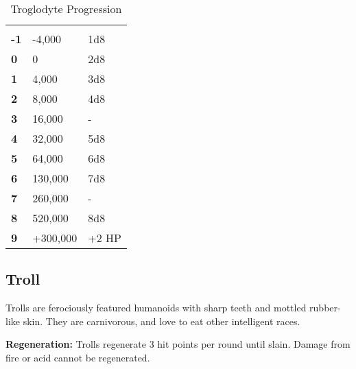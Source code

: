 \begin{multicols*}{2}
\begin {table}[H]
  \caption{Troglodyte Progression}
  \begin{tabularx}{\columnwidth}{>{\bfseries}YYY}
   &  & \\
	-1 & -4,000 & 1d8\\
	0 & 0 & 2d8\\
	1 & 4,000 & 3d8\\
	2 & 8,000 & 4d8\\
	3 & 16,000 & -\\
	4 & 32,000 & 5d8\\
	5 & 64,000 & 6d8\\
	6 & 130,000 & 7d8\\
	7 & 260,000 & -\\
	8 & 520,000 & 8d8\\
	9 & +300,000 & +2 HP
  \end {tabularx}
\end {table}

\subsection{Troll}

Trolls are ferociously featured humanoids with sharp teeth and mottled rubber-like skin. They are carnivorous, and love to eat other intelligent races.

\textbf{Regeneration:} Trolls regenerate 3 hit points per round until slain. Damage from fire or acid cannot be regenerated.


\end{multicols*}
